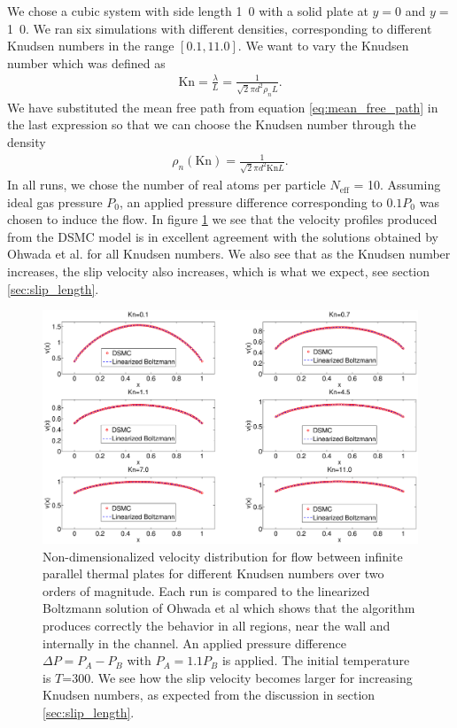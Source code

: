 We chose a cubic system with side length \unit{1.0}{\micro\meter} with a solid plate at $y=$\unit{0}{\micro\meter} and $y=$\unit{1.0}{\micro\meter}. We ran six simulations with different densities, corresponding to different Knudsen numbers in the range $[0.1, 11.0]$. We want to vary the Knudsen number which was defined as
\begin{align}
	\text{Kn} = \frac{\lambda}{L} = \frac{1}{\sqrt 2 \pi d^2 \rho_n L}.
\end{align}
We have substituted the mean free path from equation \eqref{eq:mean_free_path} in the last expression so that we can choose the Knudsen number through the density
\begin{align}
	\rho_n(\text{Kn}) = \frac{1}{\sqrt 2 \pi d^2 \text{Kn}L}.
\end{align}
In all runs, we chose the number of real atoms per particle $N_\text{eff}$ = 10. Assuming ideal gas pressure $P_0$, an applied pressure difference corresponding to $0.1P_0$ was chosen to induce the flow. In figure \ref{fig:dsmc_validation_poiseuille} we see that the velocity profiles produced from the DSMC model is in excellent agreement with the solutions obtained by Ohwada et al. for all Knudsen numbers. We also see that as the Knudsen number increases, the slip velocity also increases, which is what we expect, see section \ref{sec:slip_length}.
\begin{figure}[htpb]
\includegraphics[width=\textwidth, trim=6cm 0cm 5cm 0cm, clip]{DSMC/figures/validation_poiseuille.eps}
\centering
\caption{Non-dimensionalized velocity distribution for flow between infinite parallel thermal plates for different Knudsen numbers over two orders of magnitude. Each run is compared to the linearized Boltzmann solution of Ohwada et al\cite{ohwada1989numerical} which shows that the algorithm produces correctly the behavior in all regions, near the wall and internally in the channel. An applied pressure difference $\Delta P = P_A - P_B$ with $P_A = 1.1P_B$ is applied. The initial temperature is $T$=\unit{300}{\kelvin}. We see how the slip velocity becomes larger for increasing Knudsen numbers, as expected from the discussion in section \ref{sec:slip_length}. }
\label{fig:dsmc_validation_poiseuille}
\end{figure}